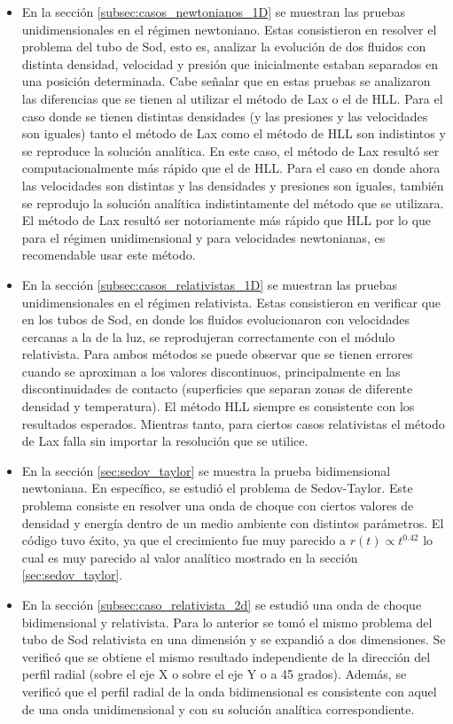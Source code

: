 \documentclass[12pt,a4paper]{book}
\begin{document}
\begin{itemize}
	\item En la sección \ref{subsec:casos_newtonianos_1D} se muestran las pruebas unidimensionales en el régimen newtoniano. Estas consistieron en resolver el problema del tubo de Sod, esto es, analizar 
  la evolución de dos fluidos con distinta densidad, velocidad y presión que inicialmente estaban separados en una posición determinada. Cabe señalar que en estas pruebas se analizaron las diferencias que se tienen 
  al utilizar el método de Lax o el de HLL. Para el caso donde se tienen distintas densidades (y las presiones y las velocidades son iguales) tanto el método de Lax como el método de HLL son indistintos y 
  se reproduce la solución analítica. En este caso, el método de Lax resultó ser computacionalmente más rápido que el de HLL. Para el caso en donde ahora las velocidades son distintas y las densidades y presiones 
  son iguales, también se reprodujo la solución analítica indistintamente del método que se utilizara. El método de Lax resultó ser notoriamente más rápido que HLL por lo que para el régimen unidimensional y 
  para velocidades newtonianas, es recomendable usar este método.
	
	\item En la sección \ref{subsec:casos_relativistas_1D} se muestran las pruebas unidimensionales en el régimen relativista. Estas consistieron en verificar que en los tubos de Sod, en donde los fluidos evolucionaron 
  con velocidades cercanas a la de la luz, se reprodujeran correctamente con el módulo relativista. Para ambos métodos se puede observar que se tienen errores cuando se aproximan a los valores discontinuos, principalmente 
  en las discontinuidades de contacto (superficies que separan zonas de diferente densidad y temperatura). El método HLL siempre es consistente con los resultados esperados. Mientras tanto, para ciertos casos relativistas 
  el método de Lax falla sin importar la resolución que se utilice.
	\item En la sección \ref{sec:sedov_taylor} se muestra la prueba bidimensional newtoniana. En específico, se estudió el problema de Sedov-Taylor. Este problema consiste en resolver una onda de choque con ciertos valores 
  de densidad y energía dentro de un medio ambiente con distintos parámetros. El código tuvo éxito, ya que el crecimiento fue muy parecido a $r(t) \propto t^{0.42}$ lo cual es muy parecido al valor analítico mostrado 
  en la sección \ref{sec:sedov_taylor}.
	\item En la sección \ref{subsec:caso_relativista_2d} se estudió una onda de choque bidimensional y relativista. Para lo anterior se tomó el mismo problema del tubo de Sod relativista en una dimensión y se expandió 
  a dos dimensiones. Se verificó que se obtiene el  mismo resultado independiente de la dirección del perfil radial (sobre el eje X o sobre el eje Y o a 45 grados). Además, se verificó que el perfil radial de la onda 
  bidimensional es consistente con aquel de una onda unidimensional y con su solución analítica correspondiente.
\end{itemize}
\end{document}
